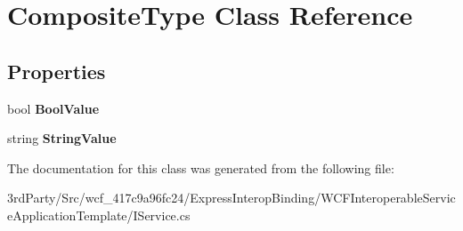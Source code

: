 \hypertarget{class_composite_type}{\section{Composite\-Type Class Reference}
\label{class_composite_type}
}
\subsection*{Properties}
\begin{DoxyCompactItemize}
\item 
\hypertarget{class_composite_type_aec5c2fdb0e92c89407abb4daf5e3152b}{bool {\bfseries Bool\-Value}}\label{class_composite_type_aec5c2fdb0e92c89407abb4daf5e3152b}

\item 
\hypertarget{class_composite_type_a5717c042262df5eda670ec616c66122c}{string {\bfseries String\-Value}}\label{class_composite_type_a5717c042262df5eda670ec616c66122c}

\end{DoxyCompactItemize}


The documentation for this class was generated from the following file\-:\begin{DoxyCompactItemize}
\item 
3rd\-Party/\-Src/wcf\-\_\-417c9a96fc24/\-Express\-Interop\-Binding/\-W\-C\-F\-Interoperable\-Service\-Application\-Template/I\-Service.\-cs\end{DoxyCompactItemize}
